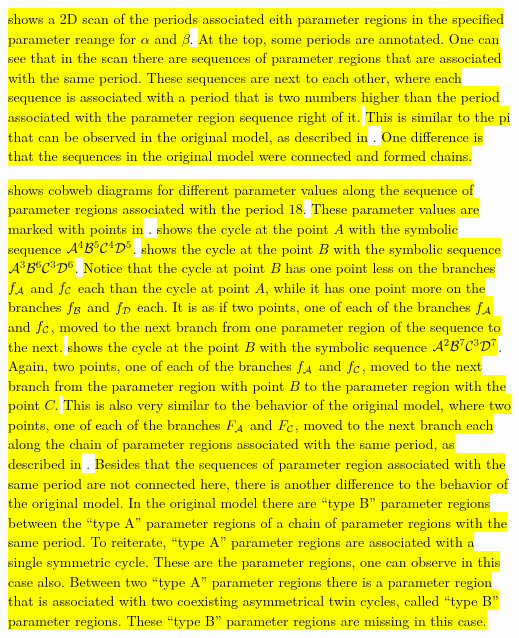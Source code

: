  \hl{shows a 2D scan of the periods associated eith parameter regions in the specified parameter reange for $\alpha$ and $\beta$}.
\hl{
	At the top, some periods are annotated.
	One can see that in the scan there are sequences of parameter regions that are associated with the same period.
	These sequences are next to each other, where each sequence is associated with a period that is two numbers higher than the period associated with the parameter region sequence right of it.
}
\hl{This is similar to the \gls{pi} that can be observed in the original model, as described in} .
\hl{
	One difference is that the sequences in the original model were connected and formed chains.
}

 \hl{shows cobweb diagrams for different parameter values along the sequence of parameter regions associated with the period $18$}.
\hl{These parameter values are marked with points in} .
 \hl{shows the cycle at the point $A$ with the symbolic sequence $\mathcal{A}^4\mathcal{B}^5\mathcal{C}^4\mathcal{D}^5$}.
 \hl{shows the cycle at the point $B$ with the symbolic sequence $\mathcal{A}^3\mathcal{B}^6\mathcal{C}^3\mathcal{D}^6$}.
\hl{
	Notice that the cycle at point $B$ has one point less on the branches $f_{\mathcal{A}}$ and $f_{\mathcal{C}}$ each than the cycle at point $A$, while it has one point more on the branches $f_{\mathcal{B}}$ and $f_{\mathcal{D}}$ each.
	It is as if two points, one of each of the branches $f_{\mathcal{A}}$ and $f_{\mathcal{C}}$, moved to the next branch from one parameter region of the sequence to the next.
}
 \hl{shows the cycle at the point $B$ with the symbolic sequence $\mathcal{A}^2\mathcal{B}^7\mathcal{C}^3\mathcal{D}^7$}.
\hl{
	Again, two points, one of each of the branches $f_{\mathcal{A}}$ and $f_{\mathcal{C}}$, moved to the next branch from the parameter region with point $B$ to the parameter region with the point $C$.
}
\hl{This is also very similar to the behavior of the original model, where two points, one of each of the branches $F_{\mathcal{A}}$ and $F_{\mathcal{C}}$, moved to the next branch each along the chain of parameter regions associated with the same period, as described in} .
\hl{
	Besides that the sequences of parameter region associated with the same period are not connected here, there is another difference to the behavior of the original model.
	In the original model there are ``type B'' parameter regions between the ``type A'' parameter regions of a chain of parameter regions with the same period.
	To reiterate, ``type A'' parameter regions are associated with a single symmetric cycle.
	These are the parameter regions, one can observe in this case also.
	Between two ``type A'' parameter regions there is a parameter region that is associated with two coexisting asymmetrical twin cycles, called ``type B'' parameter regions.
	These ``type B'' parameter regions are missing in this case.
}
